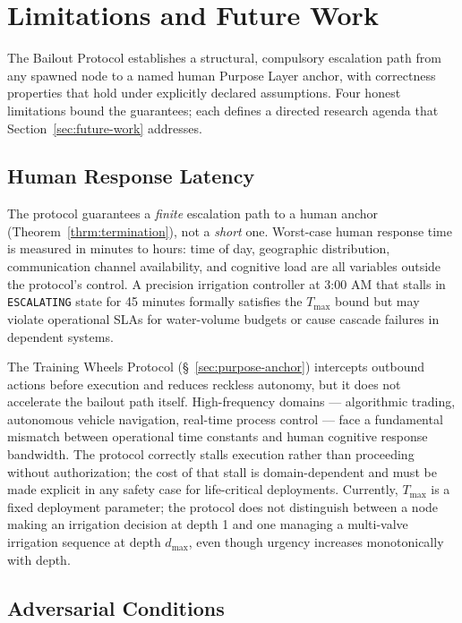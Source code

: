 \section{Limitations and Future Work}
\label{sec:limitations}

The Bailout Protocol establishes a structural, compulsory escalation path from any spawned node to a named human Purpose Layer anchor, with correctness properties that hold under explicitly declared assumptions. Four honest limitations bound the guarantees; each defines a directed research agenda that Section~\ref{sec:future-work} addresses.

\subsection{Human Response Latency}
\label{sec:limitations-latency}

The protocol guarantees a \emph{finite} escalation path to a human anchor (Theorem~\ref{thrm:termination}), not a \emph{short} one. Worst-case human response time is measured in minutes to hours: time of day, geographic distribution, communication channel availability, and cognitive load are all variables outside the protocol's control. A precision irrigation controller at 3:00 AM that stalls in \texttt{ESCALATING} state for 45 minutes formally satisfies the $T_{\max}$ bound but may violate operational SLAs for water-volume budgets or cause cascade failures in dependent systems.

The Training Wheels Protocol (\S~\ref{sec:purpose-anchor}) intercepts outbound actions before execution and reduces reckless autonomy, but it does not accelerate the bailout path itself. High-frequency domains — algorithmic trading, autonomous vehicle navigation, real-time process control — face a fundamental mismatch between operational time constants and human cognitive response bandwidth. The protocol correctly stalls execution rather than proceeding without authorization; the cost of that stall is domain-dependent and must be made explicit in any safety case for life-critical deployments. Currently, $T_{\max}$ is a fixed deployment parameter; the protocol does not distinguish between a node making an irrigation decision at depth 1 and one managing a multi-valve irrigation sequence at depth $d_{\max}$, even though urgency increases monotonically with depth.

\subsection{Adversarial Conditions}
\label{sec:limitations-adversarial}

